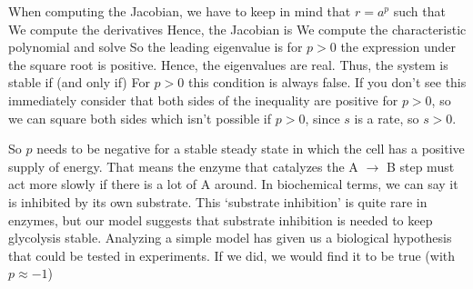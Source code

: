 \solution
When computing the Jacobian, we have to keep in mind that $r=a^p$ such that
We compute the derivatives 
Hence, the Jacobian is 
We compute the characteristic polynomial
and solve 
So the leading eigenvalue is   
for $p>0$ the expression under the square root is positive. Hence, the eigenvalues are real. Thus, the system is stable if (and only if)
For $p>0$ this condition is always false. If you don't see this immediately consider that both sides of the inequality are positive for $p>0$, so we can square both sides
which isn't possible if $p>0$, since $s$ is a rate, so $s>0$. 

So $p$ needs to be negative for a stable steady state in which the cell has a positive supply of energy. That means the enzyme that catalyzes the A $\rightarrow$ B step must act more slowly if there is a lot of A around. In biochemical terms, we can say it is inhibited by its own substrate. This `substrate inhibition' is quite rare in enzymes, but our model suggests that substrate inhibition is needed to keep glycolysis stable. Analyzing a simple model has given us a biological hypothesis that could be tested in experiments. If we did, we would find it to be true (with $p\approx -1$)
